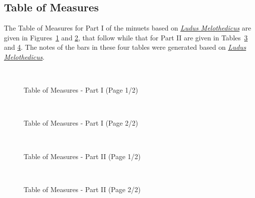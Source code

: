 \documentclass[a4paper,x11names,svgnames,10pt]{article}
\begin{document}
{\subsection{Table of Measures}\label{tabMeas}

The Table of Measures for Part I of the minuets based on \href{https://imslp.org/wiki/Ludus_Melothedicus_(Anonymous)}{{\em Ludus Melothedicus}} are given in Figures~\ref{fig:meas1} and  \ref{fig:meas2}, that follow while that for Part II are given in Tables~\ref{fig:meas3} and \ref{fig:meas4}.  The notes of the bars in these four tables were generated based on \href{https://imslp.org/wiki/Ludus_Melothedicus_(Anonymous)}{\href{https://imslp.org/wiki/Ludus_Melothedicus_(Anonymous)}{{\em Ludus Melothedicus}}}.

${}_{}$\\
\vspace{0.10in}
\begin{figure}[H]
	\centering
	\def\svgwidth{0.975\columnwidth}
	
	\caption{Table of Measures - Part I (Page 1/2)}
	\label{fig:meas1}
\end{figure}

\newpage
${}_{}$\\
\vspace{0.10in}
\begin{figure}[H]
	\centering
	\def\svgwidth{0.975\columnwidth}
	
	\caption{Table of Measures - Part I (Page 2/2)}
	\label{fig:meas2}
\end{figure}

${}_{}$\\
\vspace{0.10in}
\begin{figure}[H]
	\centering
	\def\svgwidth{0.975\columnwidth}
	
	\caption{Table of Measures - Part II (Page 1/2)}
	\label{fig:meas3}
\end{figure}

\newpage
${}_{}$\\
\vspace{0.10in}
\begin{figure}[H]
	\centering
	\def\svgwidth{0.975\columnwidth}
	
	\caption{Table of Measures - Part II (Page 2/2)}
	\label{fig:meas4}
\end{figure}

}
\end{document}
